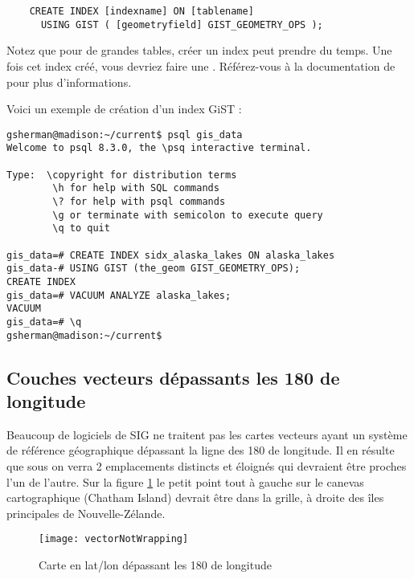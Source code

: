 \begin{verbatim}
    CREATE INDEX [indexname] ON [tablename]
      USING GIST ( [geometryfield] GIST_GEOMETRY_OPS );
\end{verbatim}

Notez que pour de grandes tables, créer un index peut prendre du temps. Une fois cet index créé, vous devriez faire une . Référez-vous à la documentation de \cite{PostGISweb} pour plus d'informations.

Voici un exemple de création d'un index GiST :
\begin{verbatim}
gsherman@madison:~/current$ psql gis_data
Welcome to psql 8.3.0, the \psq interactive terminal.

Type:  \copyright for distribution terms
        \h for help with SQL commands
        \? for help with psql commands
        \g or terminate with semicolon to execute query
        \q to quit

gis_data=# CREATE INDEX sidx_alaska_lakes ON alaska_lakes
gis_data-# USING GIST (the_geom GIST_GEOMETRY_OPS);
CREATE INDEX
gis_data=# VACUUM ANALYZE alaska_lakes;
VACUUM
gis_data=# \q
gsherman@madison:~/current$
\end{verbatim}

\subsection{Couches vecteurs dépassants les 180\degres{} de longitude}

Beaucoup de logiciels de SIG ne traitent pas les cartes vecteurs  ayant un système de référence géographique dépassant la ligne des 180\degres{} de longitude. Il en résulte que sous \qg on verra 2 emplacements distincts et éloignés qui devraient être proches l'un de l'autre. Sur la figure \ref{fig:vector_not_wrapping} le petit point tout à gauche sur le canevas cartographique (Chatham Island) devrait être dans la grille, à droite des îles principales de Nouvelle-Zélande.

\begin{figure}[ht]
   \begin{center}
   \texttt{[image: vectorNotWrapping]}
   \caption{Carte en lat/lon dépassant les 180\degres{} de longitude \nixcaption}
   \label{fig:vector_not_wrapping}
\end{center}
\end{figure}

